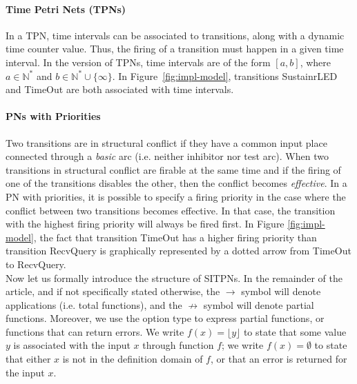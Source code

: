 \documentclass[pdflatex,sn-mathphys]{sn-jnl}%
\theoremstyle{thmstyleone}%
\theoremstyle{thmstyletwo}%
\theoremstyle{thmstylethree}%
\begin{document}
\paragraph{Time Petri Nets (TPNs)}

In a TPN, time intervals can be associated to transitions, along with
a dynamic time counter value. Thus, the firing of a transition must
happen in a given time interval. In the \hilecop{} version of TPNs,
time intervals are of the form $[a, b]$, where $a\in\mathbb{N}^{*}$
and $b\in\mathbb{N}^{*}\cup\{\infty\}$.  In
Figure~\ref{fig:impl-model}, transitions SustainrLED and TimeOut are
both associated with time intervals.

\paragraph{PNs with Priorities}

Two transitions are in structural conflict if they have a common input
place connected through a \textit{basic} arc (i.e. neither inhibitor
nor test arc). When two transitions in structural conflict are firable
at the same time and if the firing of one of the transitions disables
the other, then the conflict becomes \textit{effective}. In a PN with
priorities, it is possible to specify a firing priority in the case
where the conflict between two transitions becomes effective. In that
case, the transition with the highest firing priority will always be
fired first. In Figure \ref{fig:impl-model}, the fact that transition
TimeOut has a higher firing priority than
transition RecvQuery is graphically represented by a dotted arrow from TimeOut to RecvQuery. \\

\noindent{}Now let us formally introduce the structure of SITPNs. In
the remainder of the article, and if not specifically stated
otherwise, the $\rightarrow$ symbol will denote applications
(i.e. total functions), and the $\nrightarrow$ symbol will denote
partial functions. Moreover, we use the option type to express partial
functions, or functions that can return errors.  We write
$f(x)=\lfloor{}y\rfloor$ to state that some value $y$ is associated
with the input $x$ through function $f$; we write $f(x)=\emptyset$ to
state that either $x$ is not in the definition domain of $f$, or that
an error is returned for the input $x$.
\end{document}
